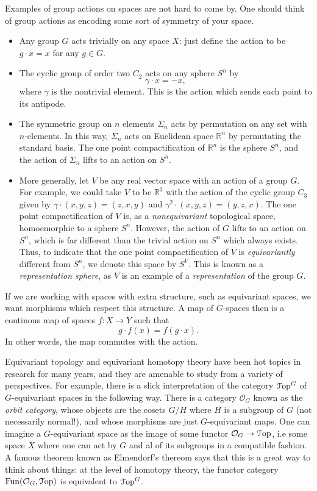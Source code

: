 \documentclass[10pt]{amsart}
\newcommand{\euscr}[1]{\EuScript{#1}}
\theoremstyle{definition}
\newcommand{\cdef}[1]{\textcolor{Bittersweet}{#1}}
\begin{document}
Examples of group actions on spaces are not hard to come by. One should think of group actions as encoding some sort of symmetry of your space.
\begin{itemize}
    \item Any group $G$ acts trivially on any space $X$: just define the action to be $g \cdot x = x$ for any $g \in G$.
    \item The cyclic group of order two $C_2$ acts on any sphere $S^n$ by 
    \[\gamma \cdot x = -x,\]
    where $\gamma$ is the nontrivial element. This is the action which sends each point to its antipode.
    \item The symmetric group on $n$ elements $\Sigma_n$ acts by permutation on any set with $n$-elements. In this way, $\Sigma_n$ acts on Euclidean space $\mathbb{R}^n$ by permutating the standard basis. The one point compactification of $\mathbb{R}^n$ is the sphere $S^n$, and the action of $\Sigma_n$ lifts to an action on $S^n$. 
    \item More generally, let $V$ be any real vector space with an action of a group $G$. For example, we could take $V$ to be $\mathbb{R}^3$ with the action of the cyclic group $C_3$ given by $\gamma \cdot  (x, y, z) = (z, x, y)$ and $\gamma^2 \cdot (x, y, z) = (y,z,x)$. The one point compactification of $V$ is, as a \emph{nonequivariant} topological space, homoemorphic to a sphere $S^n$. However, the action of $G$ lifts to an action on $S^n$, which is far different than the trivial action on $S^n$ which always exists. Thus, to indicate that the one point compactification of $V$ is \emph{equivariantly} different from $S^n$, we denote this space by $S^V$. This is known as a \cdef{\emph{representation sphere}}, as $V$ is an example of a \cdef{\emph{representation}} of the group $G$.
\end{itemize}
If we are working with spaces with extra structure, such as equivariant spaces, we want morphisms which respect this structure. A map of $G$-spaces then is a continous map of spaces $f:X \to Y$ such that
\[
g \cdot f(x) = f(g \cdot x).
\]
In other words, the map commutes with the action.

Equivariant topology and equivariant homotopy theory have been hot topics in research for many years, and they are amenable to study from a variety of perspectives. For example, there is a slick interpretation of the category $\euscr{T}\mathrm{op}^G$ of $G$-equivariant spaces in the following way. There is a category $\mathcal{O}_G$ known as the \cdef{\emph{orbit category}}, whose objects are the cosets $G/H$ where $H$ is a subgroup of $G$ (not necessarily normal!), and whose morphisms are just $G$-equivariant maps. One can imagine a $G$-equivariant space as the image of some functor $\mathcal{O}_G \to \euscr{T}\mathrm{op}$, i.e some space $X$ where one can act by $G$ and al of its subgroups in a compatible fashion. A famous theorem known as Elmendorf's thereom says that this is a great way to think about things: at the level of homotopy theory, the functor category $\text{Fun}(\mathcal{O}_G, \euscr{T}\mathrm{op})$ is equivalent to $\euscr{T}\mathrm{op}^G$. 
\end{document}

